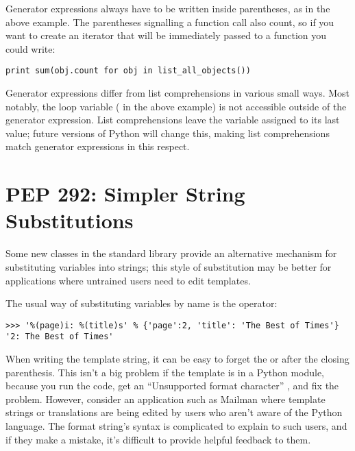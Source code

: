 \documentclass{howto}
\begin{document}
Generator expressions always have to be written inside parentheses, as
in the above example.  The parentheses signalling a function call also
count, so if you want to create an iterator that will be immediately
passed to a function you could write:

\begin{verbatim}
print sum(obj.count for obj in list_all_objects())
\end{verbatim}

Generator expressions differ from list comprehensions in various small
ways.  Most notably, the loop variable ( in the above
example) is not accessible outside of the generator expression.  List
comprehensions leave the variable assigned to its last value; future
versions of Python will change this, making list comprehensions match
generator expressions in this respect.

\begin{seealso}
\end{seealso}


\section{PEP 292: Simpler String Substitutions}

Some new classes in the standard library provide an alternative
mechanism for substituting variables into strings; this style of
substitution may be better for applications where untrained
users need to edit templates.

The usual way of substituting variables by name is the \code{\%}
operator:

\begin{verbatim}
>>> '%(page)i: %(title)s' % {'page':2, 'title': 'The Best of Times'}
'2: The Best of Times'
\end{verbatim}

When writing the template string, it can be easy to forget the
 or  after the closing parenthesis.  This isn't a big
problem if the template is in a Python module, because you run the
code, get an ``Unsupported format character'' ,
and fix the problem.  However, consider an application such as Mailman
where template strings or translations are being edited by users who
aren't aware of the Python language.  The format string's syntax is
complicated to explain to such users, and if they make a mistake, it's
difficult to provide helpful feedback to them.
\end{document}
